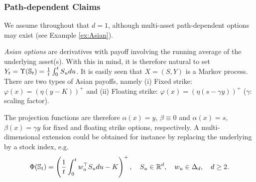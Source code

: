 

\subsubsection*{Path-dependent Claims}

We assume throughout that $d=1$, although multi-asset path-dependent options may exist (see  Example \ref{ex:Asian}). %

\begin{example}\label{ex:Asian}
\textit{Asian options} %
are %
derivatives with payoff involving the running average of the  underlying asset(s).  With this in mind, it is therefore natural to set $Y_t=\Upsilon(\operatorname{\mathbb{S}}_t) = \frac{1}{t} \int_0^t S_u du$. It is easily seen that $X=(S,Y)$ is a Markov process.
There are two types of Asian payoffs, namely (i) Fixed strike: $\varphi(x) = \left(\eta (y - K)\right)^{+}$ and (ii) Floating strike:  $\varphi(x) = \left(\eta (s - \gamma y)\right)^{+}$ ($\gamma$: scaling factor).

The projection functions are therefore $\alpha(x)=y$, $\beta \equiv 0$ and  $\alpha(x)=s$, $\beta(x) = \gamma y$ for fixed and floating strike options, respectively. %
A multi-dimensional extension  could be obtained for instance by replacing the underlying by a stock index, e.g.
$$ \Phi(\operatorname{\mathbb{S}}_t) = \left( \frac{1}{t} \int_0^t w_u^{\top} S_u du - K\right)^{+}, \quad S_u\in \operatorname{\mathbb{R}}^d, \quad w_u\in \Delta_{d},\quad d\ge 2.$$


\end{example}


